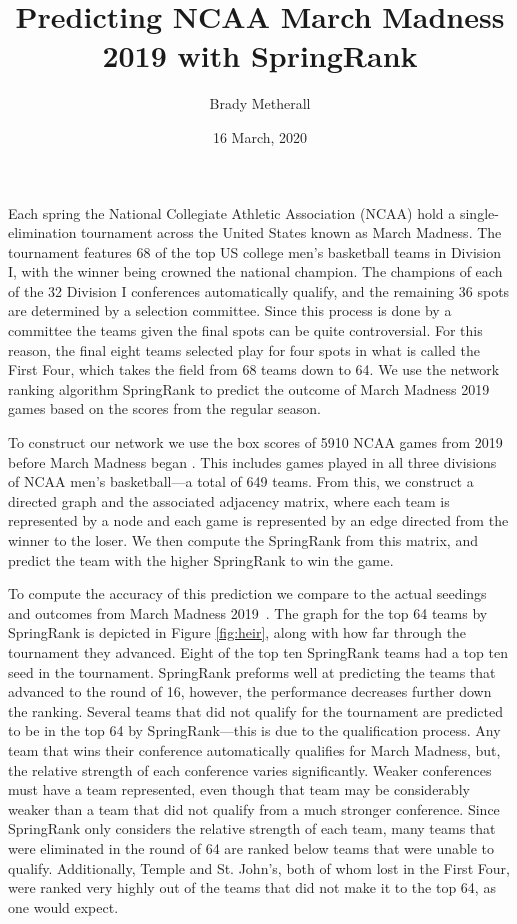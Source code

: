 \documentclass[a4paper,twocolumn,aps,prl]{revtex4-1}
\begin{document}
\title{Predicting NCAA March Madness 2019 with SpringRank}
\author{Brady Metherall}
\date{16 March, 2020}

\maketitle

\noindent
Each spring the National Collegiate Athletic Association (NCAA) hold a single-elimination tournament across the United States known as March Madness. The tournament features 68 of the top US college men's basketball teams in Division I, with the winner being crowned the national champion. The champions of each of the 32 Division I conferences automatically qualify, and the remaining 36 spots are determined by a selection committee. Since this process is done by a committee the teams given the final spots can be quite controversial. For this reason, the final eight teams selected play for four spots in what is called the First Four, which takes the field from 68 teams down to 64. We use the network ranking algorithm SpringRank \cite{debacco} to predict the outcome of March Madness 2019 games based on the scores from the regular season.

To construct our network we use the box scores of 5910 NCAA games from 2019 before March Madness began \cite{wirth}. This includes games played in all three divisions of NCAA men's basketball---a total of 649 teams. From this, we construct a directed graph and the associated adjacency matrix, where each team is represented by a node and each game is represented by an edge directed from the winner to the loser. We then compute the SpringRank from this matrix, and predict the team with the higher SpringRank to win the game.

To compute the accuracy of this prediction we compare to the actual seedings and outcomes from March Madness 2019~\cite{vanderkam}. The graph for the top 64 teams by SpringRank is depicted in Figure \ref{fig:heir}, along with how far through the tournament they advanced. Eight of the top ten SpringRank teams had a top ten seed in the tournament. SpringRank preforms well at predicting the teams that advanced to the round of 16, however, the performance decreases further down the ranking. Several teams that did not qualify for the tournament are predicted to be in the top 64 by SpringRank---this is due to the qualification process. Any team that wins their conference automatically qualifies for March Madness, but, the relative strength of each conference varies significantly. Weaker conferences must have a team represented, even though that team may be considerably weaker than a team that did not qualify from a much stronger conference. Since SpringRank only considers the relative strength of each team, many teams that were eliminated in the round of 64 are ranked below teams that were unable to qualify. Additionally, Temple and St. John's, both of whom lost in the First Four, were ranked very highly out of the teams that did not make it to the top 64, as one would expect.
\end{document}
